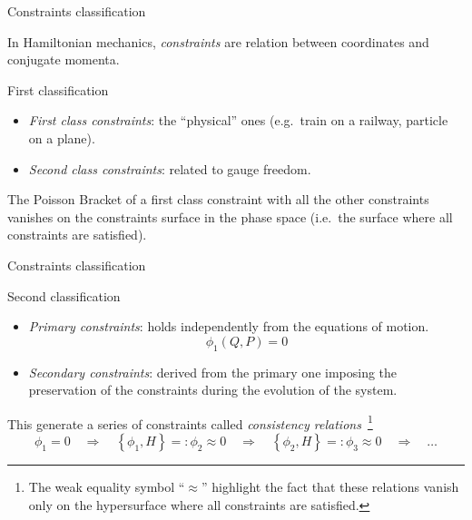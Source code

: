 \begin{frame}{Constraints classification}
  \begin{definition} \vspace{0.3em}
    In Hamiltonian mechanics, \emph{constraints} are relation between
    coordinates and conjugate momenta.
  \end{definition}
  \begin{alertblock}{First classification}
    \begin{itemize}
      \item \emph{First class constraints}: the ``physical'' ones (e.g.\ train
        on a railway, particle on a plane).
      \item \emph{Second class constraints}: related to gauge freedom.
    \end{itemize}
  \end{alertblock}
  \begin{remark} \vspace{0.3em}
    The Poisson Bracket of a first class constraint with all the
    other constraints vanishes on the constraints surface in the phase space
    (i.e.\ the surface where all constraints are satisfied).
  \end{remark}
\end{frame}

\begin{frame}{Constraints classification}
  \begin{alertblock}{Second classification}
    \begin{itemize}
      \item \emph{Primary constraints}: holds independently from the equations
        of motion.
      \begin{equation*} \label{eq:constraint}
        \phi_1(Q, P) = 0
      \end{equation*}
      \item \emph{Secondary constraints}: derived from the primary one
        imposing the preservation of the constraints during the evolution of
        the system.
    \end{itemize}
    This generate a series of constraints called \emph{consistency
      relations}~\footnote{
      The weak equality symbol ``$\approx$'' highlight the fact that these
      relations vanish only on the hypersurface where all constraints are
      satisfied.
    }
    \begin{equation*} \label{eq:consistency_relations}
      \phi_1 = 0 \quad \Rightarrow \quad
      \left\{ \phi_1 , H \right\} =: \phi_2 \approx 0 \quad \Rightarrow \quad
      \left\{ \phi_2 , H \right\} =: \phi_3 \approx 0 \quad \Rightarrow \quad
      \ldots
    \end{equation*}
  \end{alertblock}
\end{frame}

